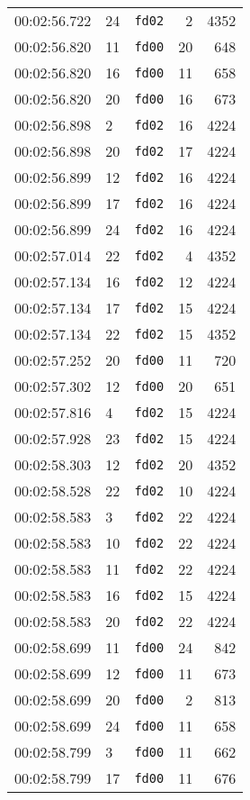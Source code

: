 \documentclass{article}
\begin{document}
\begin{longtable}{lllrr}
00:02:56.722 & 24 & \texttt{fd02} & 2 & 4352 \\
00:02:56.820 & 11 & \texttt{fd00} & 20 & 648 \\
00:02:56.820 & 16 & \texttt{fd00} & 11 & 658 \\
00:02:56.820 & 20 & \texttt{fd00} & 16 & 673 \\
00:02:56.898 & 2 & \texttt{fd02} & 16 & 4224 \\
00:02:56.898 & 20 & \texttt{fd02} & 17 & 4224 \\
00:02:56.899 & 12 & \texttt{fd02} & 16 & 4224 \\
00:02:56.899 & 17 & \texttt{fd02} & 16 & 4224 \\
00:02:56.899 & 24 & \texttt{fd02} & 16 & 4224 \\
00:02:57.014 & 22 & \texttt{fd02} & 4 & 4352 \\
00:02:57.134 & 16 & \texttt{fd02} & 12 & 4224 \\
00:02:57.134 & 17 & \texttt{fd02} & 15 & 4224 \\
00:02:57.134 & 22 & \texttt{fd02} & 15 & 4352 \\
00:02:57.252 & 20 & \texttt{fd00} & 11 & 720 \\
00:02:57.302 & 12 & \texttt{fd00} & 20 & 651 \\
00:02:57.816 & 4 & \texttt{fd02} & 15 & 4224 \\
00:02:57.928 & 23 & \texttt{fd02} & 15 & 4224 \\
00:02:58.303 & 12 & \texttt{fd02} & 20 & 4352 \\
00:02:58.528 & 22 & \texttt{fd02} & 10 & 4224 \\
00:02:58.583 & 3 & \texttt{fd02} & 22 & 4224 \\
00:02:58.583 & 10 & \texttt{fd02} & 22 & 4224 \\
00:02:58.583 & 11 & \texttt{fd02} & 22 & 4224 \\
00:02:58.583 & 16 & \texttt{fd02} & 15 & 4224 \\
00:02:58.583 & 20 & \texttt{fd02} & 22 & 4224 \\
00:02:58.699 & 11 & \texttt{fd00} & 24 & 842 \\
00:02:58.699 & 12 & \texttt{fd00} & 11 & 673 \\
00:02:58.699 & 20 & \texttt{fd00} & 2 & 813 \\
00:02:58.699 & 24 & \texttt{fd00} & 11 & 658 \\
00:02:58.799 & 3 & \texttt{fd00} & 11 & 662 \\
00:02:58.799 & 17 & \texttt{fd00} & 11 & 676 \\

\end{longtable}
\end{document}
